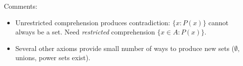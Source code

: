 \begin{exercises}{}{}
\begin{enumerate}
% 

% 
\end{enumerate}

Comments:
\begin{itemize}
  \item Unrestricted comprehension produces contradiction: $\{x:P(x)\}$ cannot always be a set. Need \emph{restricted} comprehension $\{x\in A:P(x)\}$.
  \item Several other axioms provide small number of ways to produce new sets ($\emptyset$, unions, power sets exist).
\end{itemize}

\end{exercises}
